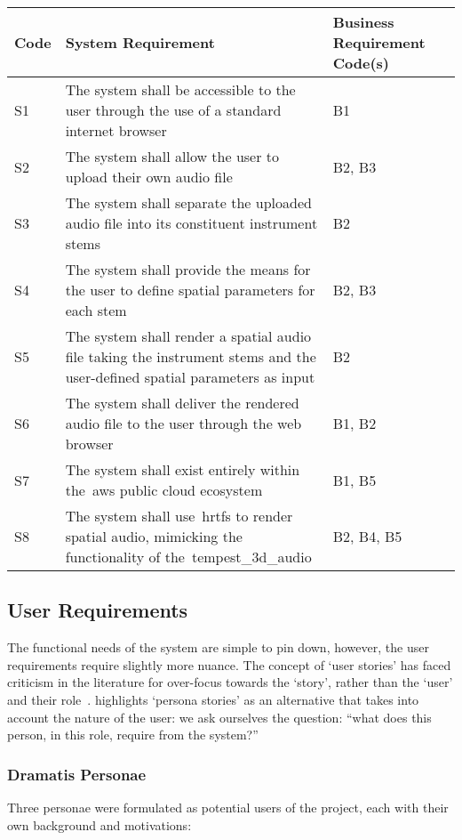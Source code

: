\begin{tabularx}{\textwidth}{szs}
    \caption{System Requirements}\label{tab:system-requirements}\\
    \hline
    \textbf{Code} & \textbf{System Requirement} & \textbf{Business Requirement Code(s)} \\\hline
    S1 & The system shall be accessible to the user through the use of a standard internet browser & B1 \\\hline
    S2 & The system shall allow the user to upload their own audio file & B2, B3 \\\hline
    S3 & The system shall separate the uploaded audio file into its constituent instrument stems & B2 \\\hline
    S4 & The system shall provide the means for the user to define spatial parameters for each stem & B2, B3 \\\hline
    S5 & The system shall render a spatial audio file taking the instrument stems and the user-defined spatial parameters as input & B2 \\\hline
    S6 & The system shall deliver the rendered audio file to the user through the web browser & B1, B2 \\\hline
    S7 & The system shall exist entirely within the~\gls{aws} public cloud ecosystem & B1, B5 \\\hline
    S8 & The system shall use~\glspl{hrtf} to render spatial audio, mimicking the functionality of the~\gls{tempest_3d_audio} & B2, B4, B5 \\\hline
\end{tabularx}

\subsection{User Requirements}\label{subsec:user-requirements}
The functional needs of the system are simple to pin down, however, the user requirements require slightly more nuance.
The concept of `user stories' has faced criticism in the literature for over-focus towards the `story', rather than the `user' and their role~\citep{hudson2013user}.
\citet{hudson2013user} highlights `persona stories' as an alternative that takes into account the nature of the user: we ask ourselves the question: ``what does this person, in this role, require from the system?''

\subsubsection{Dramatis Personae}
Three personae were formulated as potential users of the project, each with their own background and motivations:

